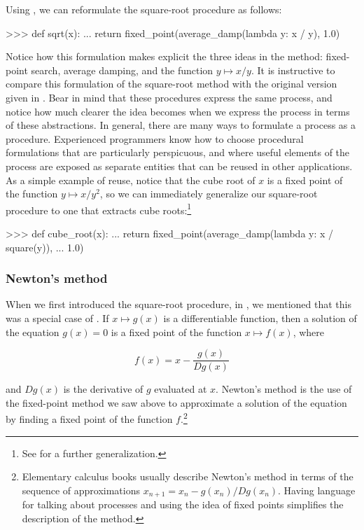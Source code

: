 \noindent
Using , we can reformulate the square-root procedure as
follows:

\begin{codeBlock}
>>> def sqrt(x):
...     return fixed_point(average_damp(lambda y: x / y), 1.0)
\end{codeBlock}

\noindent
Notice how this formulation makes explicit the three ideas in the method:
fixed-point search, average damping, and the function \( y \mapsto x / y \).
It is instructive to compare this formulation of the square-root method with
the original version given in .  Bear in mind that these
procedures express the same process, and notice how much clearer the idea
becomes when we express the process in terms of these abstractions.  In
general, there are many ways to formulate a process as a procedure.
Experienced programmers know how to choose procedural formulations that are
particularly perspicuous, and where useful elements of the process are exposed
as separate entities that can be reused in other applications.  As a simple
example of reuse, notice that the cube root of \( x \) is a fixed point of the
function \( y \mapsto x / y^2 \), so we can immediately generalize our
square-root procedure to one that extracts cube roots:\footnote{See
 for a further generalization.}

\begin{codeBlock}
>>> def cube_root(x):
...     return fixed_point(average_damp(lambda y: x / square(y)),
...                        1.0)
\end{codeBlock}

\subsubsection*{Newton's method}

When we first introduced the square-root procedure, in , we
mentioned that this was a special case of .  If \( x
\mapsto g(x) \) is a differentiable function, then a solution of the equation
\( g(x) = 0 \) is a fixed point of the function \( x \mapsto f(x) \), where

$$ {f(x) = x} - \frac{g(x)}{Dg(x)} $$

\noindent
and \( Dg(x) \) is the derivative of \( g \) evaluated at \( x \).  Newton's
method is the use of the fixed-point method we saw above to approximate a
solution of the equation by finding a fixed point of the function
\( f\!. \)\footnote{Elementary calculus books usually describe Newton's method in
terms of the sequence of approximations \( x_{n+1} = x_n -
g(x_n) / Dg(x_n) \).  Having language for talking about
processes and using the idea of fixed points simplifies the description of the
method.}

